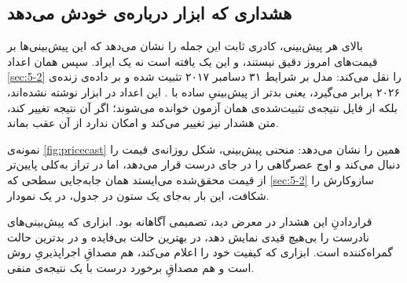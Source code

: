 \subsection*{هشداری که ابزار درباره‌ی خودش می‌دهد}

بالای هر پیش‌بینی، کادری ثابت این جمله را نشان می‌دهد که این پیش‌بینی‌ها بر
قیمت‌های امروز دقیق نیستند، و این یک یافته است نه یک ایراد. سپس همان اعداد
\cref{sec:5-2} را نقل می‌کند: مدل بر شرایط ۳۱ دسامبر ۲۰۱۷ تثبیت شده و بر داده‌ی
زنده‌ی ۲۰۲۶  برابر  می‌گیرد، یعنی بدتر از پیش‌بینیِ ساده با
. این اعداد در ابزار نوشته نشده‌اند، بلکه از فایل نتیجه‌ی تثبیت‌شده‌ی
همان آزمون خوانده می‌شوند؛ اگر آن نتیجه تغییر کند، متن هشدار نیز تغییر می‌کند و
امکان ندارد از آن عقب بماند.

نمونه‌ی \cref{fig:pricecast} همین را نشان می‌دهد: منحنی پیش‌بینی، شکل روزانه‌ی
قیمت را دنبال می‌کند و اوج عصرگاهی را در جای درست قرار می‌دهد، اما در تراز
به‌کلی پایین‌تر از قیمت محقق‌شده می‌ایستد  همان جابه‌جایی سطحی که
\cref{sec:5-2} سازوکارش را شکافت، این بار به‌جای یک ستون در جدول، در یک نمودار.

قراردادنِ این هشدار در معرض دید، تصمیمی آگاهانه بود. ابزاری که پیش‌بینی‌های
نادرست را بی‌هیچ قیدی نمایش دهد، در بهترین حالت بی‌فایده و در بدترین حالت
گمراه‌کننده است. ابزاری که کیفیت خود را اعلام می‌کند، هم مصداقِ اجراپذیریِ روش
است و هم مصداقِ برخورد درست با یک نتیجه‌ی منفی.
